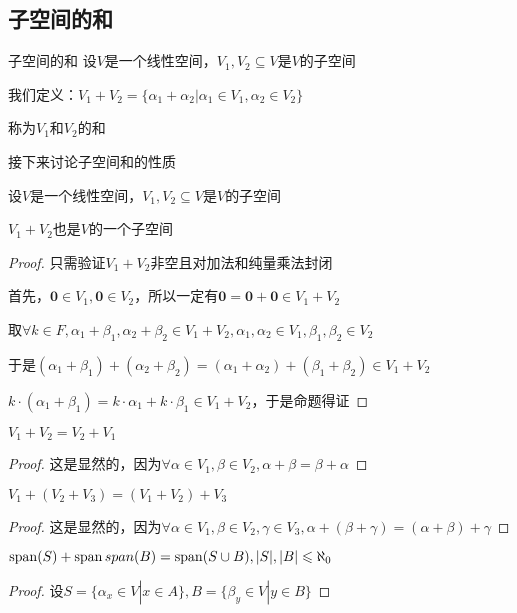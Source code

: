 \documentclass[12pt, a4paper, oneside, UTF8]{ctexbook}
\begin{document}
		\subsection{子空间的和}
			\begin{defn}{子空间的和}{}
				设$V$是一个线性空间，$V_1,V_2 \subseteq V$是$V$的子空间

				我们定义：$V_1 + V_2 = \{\alpha_1+\alpha_2 | \alpha_1 \in V_1,\alpha _2 \in V_2\}$

				称为$V_1$和$V_2$的和
			\end{defn}
			接下来讨论子空间和的性质
			\begin{para}{0}
				\point{}
					\begin{proposition}
						设$V$是一个线性空间，$V_1,V_2 \subseteq V$是$V$的子空间

						$V_1+V_2$也是$V$的一个子空间
					\end{proposition}
					\begin{proof}
						只需验证$V_1+V_2$非空且对加法和纯量乘法封闭

						首先，$\mathbf{0}\in V_1 ,\mathbf{0}\in V_2$，所以一定有$\mathbf{0}=\mathbf{0}+\mathbf{0} \in V_1+V_2$

						取$\forall k \in F,\alpha_1+\beta_1,\alpha_2+\beta_2 \in V_1+ V_2,\alpha_1,\alpha_2 \in V_1,\beta_1,\beta_2 \in V_2$

						于是$(\alpha_1+\beta_1)+(\alpha_2+\beta_2)=(\alpha_1+\alpha_2)+(\beta_1+\beta_2)\in V_1+V_2$

						$k\cdot (\alpha_1+\beta_1)=k\cdot \alpha_1+k \cdot \beta_1 \in V_1+V_2$，于是命题得证
					\end{proof}
				\point{}
					\begin{proposition}
						$V_1+V_2=V_2+V_1$
					\end{proposition}
					\begin{proof}
						这是显然的，因为$\forall \alpha \in V_1,\beta \in V_2,\alpha +\beta =\beta +\alpha $
					\end{proof}
				\point{}
					\begin{proposition}
						$V_1+(V_2+V_3)=(V_1+V_2)+V_3$
					\end{proposition}
					\begin{proof}
						这是显然的，因为$\forall \alpha \in V_1,\beta \in V_2,\gamma \in V_3,\alpha +(\beta+\gamma ) =(\alpha +\beta) +\gamma $
					\end{proof}
				\point{}
					\begin{proposition}
						$\operatorname{span}(S)+\operatorname{span}{span}(B)=\operatorname{span}(S \cup B),|S|,|B| \leqslant \aleph_0$
					\end{proposition}
					\begin{proof}
						设$S=\{\alpha_x \in V| x\in A\},B=\{\beta_y \in V| y \in B\}$


\end{proof}
\end{para}
\end{document}
